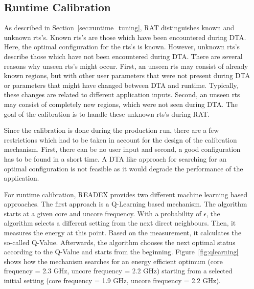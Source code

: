\subsection{Runtime Calibration} \label{sec:calibration}

As described in Section~\ref{sec:runtime_tuning}, RAT distinguishes known and unknown rts's. 
Known rts's are those which have been encountered during DTA. Here, the optimal configuration for the rts's is known. However, unknown rts's describe those which have not been encountered during DTA. There are several reasons why unseen rts's might occur. First, an unseen rts may consist of already known regions, but with other user parameters that were not present during DTA or parameters that might have changed between DTA and runtime. Typically, these changes are related to different application inputs. Second, an unseen rts may consist of completely new regions, which were not seen during DTA. The goal of the calibration is to handle these unknown rts's during RAT.

Since the calibration is done during the production run, there are a few restrictions which had to be taken in account for the design of the calibration mechanism. First, there can be no user input and second, a good configuration has to be found in a short time. A DTA like approach for searching for an optimal configuration is not feasible as it would degrade the performance of the application.

For runtime calibration, READEX provides two different machine learning based approaches. The first approach is a Q-Learning based mechanism. The algorithm starts at a given core and uncore frequency. With a probability of {$\epsilon$}, the algorithm selects a different setting from the next direct neighbours. Then, it measures the energy at this point. Based on the measurement, it calculates the so-called Q-Value. Afterwards, the algorithm chooses the next optimal status according to the Q-Value and starts from the beginning. Figure~\ref{fig:qlearning} shows how the mechanism searches for an energy efficient optimum (core frequency = 2.3 GHz, uncore frequency = 2.2 GHz) starting from a selected initial setting (core frequency = 1.9 GHz, uncore frequency = 2.2 GHz).

